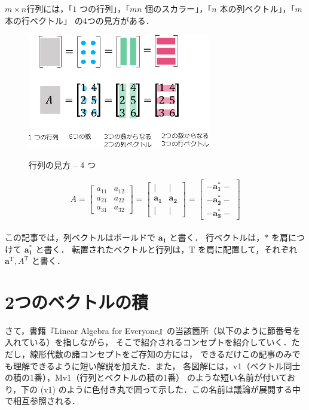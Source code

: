 \documentclass[letterpaper]{article}
\DeclareRobustCommand\transp{^{\mathrm{T}}}
\begin{document}
$m \times n$行列には，「$1$ つの行列」，「$mn$ 個のスカラー」，「$n$ 本の列ベクトル」，「$m$ 本の行ベクトル」
の4つの見方がある．

\begin{figure}[H]
  \centering
  \includegraphics[keepaspectratio, width=8cm]{ViewingMatrix-4Ways-j.eps}\\
    \caption{行列の見方 -- 4 つ}
\end{figure}


\begin{equation*}
  A= \begin{bmatrix}
    a_{11} & a_{12}\\
    a_{21} & a_{22}\\
    a_{31} & a_{32}
  \end{bmatrix}
  =
  \begin{bmatrix}
    | & |\\
    \bm{a_1} & \bm{a_2}\\
    | & |
  \end{bmatrix}
  =
  \begin{bmatrix}
    - \bm{a_1^*} -\\
    - \bm{a_2^*} -\\
    - \bm{a_3^*} -
  \end{bmatrix}
\end{equation*} \\

この記事では，列ベクトルはボールドで $\bm{a_1}$ と書く．
行ベクトルは，$\bm{*}$ を肩につけて $\bm{a_1^*}$ と書く．
転置されたベクトルと行列は，$\mathrm{T}$ を肩に配置して，それぞれ $\bm{a}\transp, A\transp$ と書く．

\section{2つのベクトルの積}

さて，書籍『Linear Algebra for Everyone』の当該箇所（以下のように節番号を入れている）を指しながら，
そこで紹介されるコンセプトを紹介していく．ただし，線形代数の諸コンセプトをご存知の方には，
できるだけこの記事のみでも理解できるように短い解説を加えた．また，
各図解には，v1（ベクトル同士の積の1番），Mv1（行列とベクトルの積の1番）
のような短い名前が付いており，下の (v1) のように色付き丸で囲って示した．この名前は議論が展開する中で相互参照される．
\end{document}
